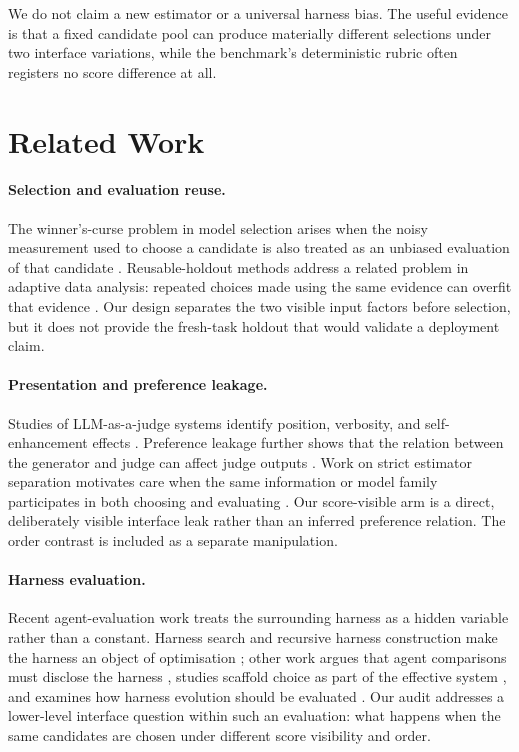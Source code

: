 \documentclass[11pt]{article}
\begin{document}
We do not claim a new estimator or a universal harness bias. The useful evidence is that a fixed
candidate pool can produce materially different selections under two interface variations, while the
benchmark's deterministic rubric often registers no score difference at all.

\section{Related Work}

\paragraph{Selection and evaluation reuse.}
The winner's-curse problem in model selection arises when the noisy measurement used to choose a
candidate is also treated as an unbiased evaluation of that candidate
\citep{cawley2010overfitting}. Reusable-holdout methods address a related problem in adaptive data
analysis: repeated choices made using the same evidence can overfit that evidence
\citep{dwork2015holdout}. Our design separates the two visible input factors before selection, but it
does not provide the fresh-task holdout that would validate a deployment claim.

\paragraph{Presentation and preference leakage.}
Studies of LLM-as-a-judge systems identify position, verbosity, and self-enhancement effects
\citep{gu2025judgesurvey,shi2024judgingjudges}. Preference leakage further shows that the relation
between the generator and judge can affect judge outputs \citep{li2025preference}. Work on strict
estimator separation motivates care when the same information or model family participates in both
choosing and evaluating \citep{nahhas2026estimator}. Our score-visible arm is a direct, deliberately
visible interface leak rather than an inferred preference relation. The order contrast is included as
a separate manipulation.

\paragraph{Harness evaluation.}
Recent agent-evaluation work treats the surrounding harness as a hidden variable rather than a
constant. Harness search and recursive harness construction make the harness an object of
optimisation \citep{xu2026harness2}; other work argues that agent comparisons must disclose the
harness \citep{zhang2026disclose}, studies scaffold choice as part of the effective system
\citep{vats2026scaffold}, and examines how harness evolution should be evaluated
\citep{harness2026rethinking}. Our audit addresses a lower-level interface question within such an
evaluation: what happens when the same candidates are chosen under different score visibility and
order.
\end{document}
